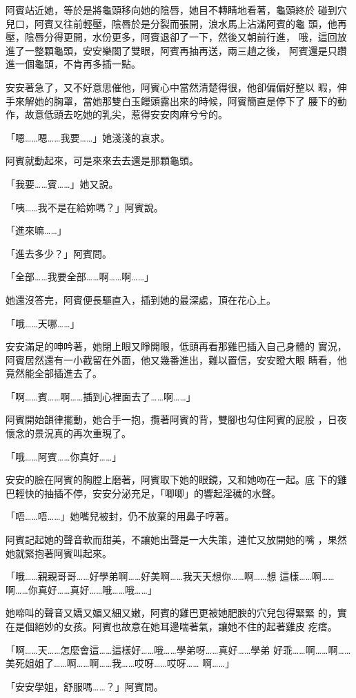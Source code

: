 阿賓站近她，等於是將龜頭移向她的陰唇，她目不轉睛地看著，龜頭終於
碰到穴兒口，阿賓又往前輕壓，陰唇於是分裂而張開，浪水馬上沾滿阿賓的龜
頭，他再壓，陰唇分得更開，水份更多，阿賓退卻了一下，然後又朝前行進，
哦，這回放進了一整顆龜頭，安安樂閤了雙眼，阿賓再抽再送，兩三趟之後，
阿賓還是只躦進一個龜頭，不肯再多插一點。

安安著急了，又不好意思催他，阿賓心中當然清楚得很，他卻偏偏好整以
暇，伸手來解她的胸罩，當她那雙白玉饅頭露出來的時候，阿賓簡直是停下了
腰下的動作，故意低頭去吃她的乳尖，惹得安安肉麻兮兮的。

「嗯……嗯……我要……」她淺淺的哀求。

阿賓就動起來，可是來來去去還是那顆龜頭。

「我要……賓……」她又說。

「咦……我不是在給妳嗎？」阿賓說。

「進來嘛……」

「進去多少？」阿賓問。

「全部……我要全部……啊……啊……」

她還沒答完，阿賓便長驅直入，插到她的最深處，頂在花心上。

「哦……天哪……」

安安滿足的呻吟著，她閉上眼又睜開眼，低頭再看那雞巴插入自己身體的
實況，阿賓居然還有一小截留在外面，他又幾番進出，難以置信，安安瞪大眼
睛看，他竟然能全部插進去了。

「啊……賓……啊……插到心裡面去了……啊……」

阿賓開始韻律擺動，她合手一抱，攬著阿賓的背，雙腳也勾住阿賓的屁股
，日夜懷念的景況真的再次重現了。

「哦……阿賓……你真好……」

安安的臉在阿賓的胸膛上磨著，阿賓取下她的眼鏡，又和她吻在一起。底
下的雞巴輕快的抽插不停，安安分泌充足，「唧唧」的響起淫穢的水聲。

「唔……唔……」她嘴兒被封，仍不放棄的用鼻子哼著。

阿賓記起她的聲音軟而甜美，不讓她出聲是一大失策，連忙又放開她的嘴
，果然她就緊抱著阿賓叫起來。

「哦……親親哥哥……好學弟啊……好美啊……我天天想你……啊……想
這樣……啊……啊……你真好……真好……哦……哦……」

她啼叫的聲音又嬌又媚又細又嫩，阿賓的雞巴更被她肥腴的穴兒包得緊緊
的，實在是個絕妙的女孩。阿賓也故意在她耳邊喘著氣，讓她不住的起著雞皮
疙瘩。

「啊……天……怎麼會這……這樣好……哦……學弟呀……真好……學弟
好乖……啊……啊……美死姐姐了……啊……啊……我……哎呀……哎呀……
啊……」

「安安學姐，舒服嗎……？」阿賓問。

